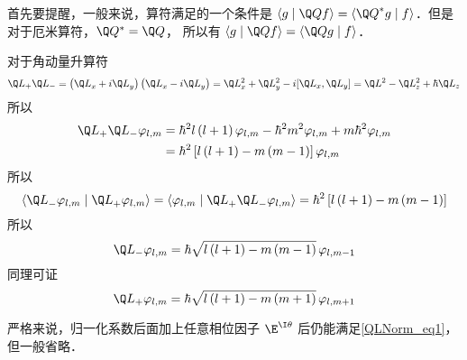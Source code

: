 


首先要提醒，一般来说，算符满足的一个条件是 $\left\langle {g}
 \mathrel{\left | {\vphantom {g {\Q Qf}}}
 \right. \kern-\nulldelimiterspace}
 {\Q Qf} \right\rangle  = \left\langle {{{\Q Q}^ * }g}
 \mathrel{\left | {\vphantom {{{{\Q Q}^ * }g} f}}
 \right. \kern-\nulldelimiterspace}
 {f} \right\rangle $．但是对于厄米算符，${\Q Q^ * } = \Q Q$， 所以有 $\left\langle {g}
 \mathrel{\left | {\vphantom {g {\Q Qf}}}
 \right. \kern-\nulldelimiterspace}
 {\Q Qf} \right\rangle  = \left\langle {\Q Qg}
 \mathrel{\left | {\vphantom {{\Q Qg} f}}
 \right. \kern-\nulldelimiterspace}
 {f} \right\rangle $．

对于角动量升算符
\begin{equation}
{\Q L_ + }{\Q L_ - } = \left( {{{\Q L}_x} + i{{\Q L}_y}} \right)\left( {{{\Q L}_x} - i{{\Q L}_y}} \right) = \Q L_x^2 + \Q L_y^2 - i[{\Q L_x},{\Q L_y}] = {\Q L^2} - \Q L_z^2 + \hbar {\Q L_z}
\end{equation} 
所以
\begin{equation}\begin{aligned}
{\Q L_ + }{\Q L_ - }{\varphi_{l,m}} &= {\hbar ^2}l\left( {l + 1} \right){\varphi_{l,m}} - {\hbar ^2}{m^2}{\varphi_{l,m}} + m{\hbar ^2}{\varphi_{l,m}} \\
&= {\hbar ^2}\left[ {l\left( {l + 1} \right) - m\left( {m - 1} \right)} \right]{\varphi_{l,m}}
\end{aligned}\end{equation} 
所以
\begin{equation}\label{QLNorm_eq1}
\left\langle {{{\Q L}_ - }{\varphi_{l,m}}}
 \mathrel{\left | {\vphantom {{{{\Q L}_ - }{\varphi_{l,m}}} {{{\Q L}_ + }{\varphi_{l,m}}}}}
 \right. \kern-\nulldelimiterspace}
 {{{\Q L}_ + }{\varphi_{l,m}}} \right\rangle  = \left\langle {\varphi_{l,m}}
 \mathrel{\left | {\vphantom {{\varphi_{l,m}} {{{\Q L}_ + }{{\Q L}_ - }{\varphi_{l,m}}}}}
 \right. \kern-\nulldelimiterspace}
 {{{\Q L}_ + }{{\Q L}_ - }{\varphi_{l,m}}} \right\rangle  = {\hbar ^2}\left[ {l\left( {l + 1} \right) - m\left( {m - 1} \right)} \right]
\end{equation} 
所以
\begin{equation}
{\Q L_ - }{\varphi_{l,m}} = \hbar \sqrt {l\left( {l + 1} \right) - m\left( {m - 1} \right)} \,{\varphi_{l,m - 1}}
\end{equation}
同理可证
\begin{equation}
{\Q L_ + }{\varphi_{l,m}} = \hbar \sqrt {l\left( {l + 1} \right) - m\left( {m + 1} \right)} \,{\varphi_{l,m + 1}}
\end{equation} 

严格来说，归一化系数后面加上任意相位因子 ${\E^{\I \theta }}$ 后仍能满足\autoref{QLNorm_eq1}， 但一般省略．



